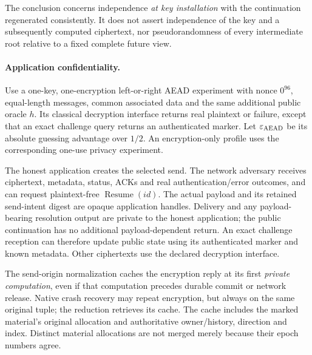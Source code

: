 The conclusion concerns independence \emph{at key installation} with the
continuation regenerated consistently. It does not assert independence
of the key and a subsequently computed ciphertext, nor pseudorandomness
of every intermediate root relative to a fixed complete future view.

\paragraph{Application confidentiality.}
Use a one-key, one-encryption left-or-right AEAD experiment with nonce
$0^{96}$, equal-length messages, common associated data and the same
additional public oracle $h$. Its classical decryption interface returns
real plaintext or failure, except that an exact challenge query returns
an authenticated marker. Let $\varepsilon_{\rm AEAD}$ be its absolute
guessing advantage over $1/2$. An encryption-only profile uses the
corresponding one-use privacy experiment.

The honest application creates the selected send. The network adversary
receives ciphertext, metadata, status, ACKs and real authentication/error
outcomes, and can request plaintext-free $\operatorname{Resume}(id)$.
The actual payload and its retained send-intent digest are opaque
application handles. Delivery and any payload-bearing resolution output
are private to the honest application; the public continuation has no
additional payload-dependent return. An exact challenge reception can
therefore update public state using its authenticated marker and known
metadata. Other ciphertexts use the declared decryption interface.

The send-origin normalization caches the encryption reply at its first
\emph{private computation}, even if that computation precedes durable
commit or network release. Native crash recovery may repeat encryption,
but always on the same original tuple; the reduction retrieves its cache.
The cache includes the marked material's original allocation and
authoritative owner/history, direction and index. Distinct material
allocations are not merged merely because their epoch numbers agree.

